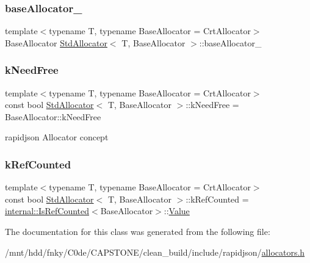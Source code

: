 \subsubsection{\texorpdfstring{base\+Allocator\+\_\+}{baseAllocator\_}}
{\footnotesize\ttfamily template$<$typename T, typename Base\+Allocator = Crt\+Allocator$>$ \\
Base\+Allocator \hyperlink{classStdAllocator}{Std\+Allocator}$<$ T, Base\+Allocator $>$\+::base\+Allocator\+\_\+\hspace{0.3cm}{\ttfamily [private]}}

\mbox{\label{classStdAllocator_a75b2c8e2995e564037dd7d5408217a6b}} 
\subsubsection{\texorpdfstring{k\+Need\+Free}{kNeedFree}}
{\footnotesize\ttfamily template$<$typename T, typename Base\+Allocator = Crt\+Allocator$>$ \\
const bool \hyperlink{classStdAllocator}{Std\+Allocator}$<$ T, Base\+Allocator $>$\+::k\+Need\+Free = Base\+Allocator\+::k\+Need\+Free\hspace{0.3cm}{\ttfamily [static]}}



rapidjson Allocator concept 

\mbox{\label{classStdAllocator_afd2564e7c3121474d93c805839fa5f83}} 
\subsubsection{\texorpdfstring{k\+Ref\+Counted}{kRefCounted}}
{\footnotesize\ttfamily template$<$typename T, typename Base\+Allocator = Crt\+Allocator$>$ \\
const bool \hyperlink{classStdAllocator}{Std\+Allocator}$<$ T, Base\+Allocator $>$\+::k\+Ref\+Counted = \hyperlink{structinternal_1_1IsRefCounted}{internal\+::\+Is\+Ref\+Counted}$<$Base\+Allocator$>$\+::\hyperlink{document_8h_a071cf97155ba72ac9a1fc4ad7e63d481}{Value}\hspace{0.3cm}{\ttfamily [static]}}



The documentation for this class was generated from the following file\+:\begin{DoxyCompactItemize}
\item 
/mnt/hdd/fnky/\+C0de/\+C\+A\+P\+S\+T\+O\+N\+E/clean\+\_\+build/include/rapidjson/\hyperlink{allocators_8h}{allocators.\+h}\end{DoxyCompactItemize}
